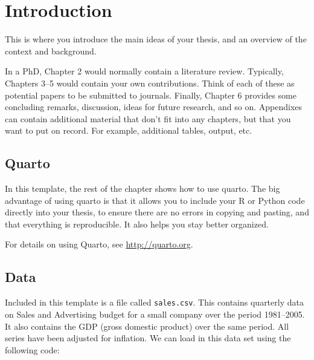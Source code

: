 \documentclass[letterpaper,             %
               oneside,                 %
               \pointsize]              %
               {memoir}
\begin{document}
\mainmatter


\hypertarget{sec-intro}{%
\chapter{Introduction}\label{sec-intro}}

This is where you introduce the main ideas of your thesis, and an
overview of the context and background.

In a PhD, Chapter 2 would normally contain a literature review.
Typically, Chapters 3--5 would contain your own contributions. Think of
each of these as potential papers to be submitted to journals. Finally,
Chapter 6 provides some concluding remarks, discussion, ideas for future
research, and so on. Appendixes can contain additional material that
don't fit into any chapters, but that you want to put on record. For
example, additional tables, output, etc.

\hypertarget{quarto}{%
\section{Quarto}\label{quarto}}

In this template, the rest of the chapter shows how to use quarto. The
big advantage of using quarto is that it allows you to include your R or
Python code directly into your thesis, to ensure there are no errors in
copying and pasting, and that everything is reproducible. It also helps
you stay better organized.

For details on using Quarto, see \url{http://quarto.org}.

\hypertarget{data}{%
\section{Data}\label{data}}

Included in this template is a file called \texttt{sales.csv}. This
contains quarterly data on Sales and Advertising budget for a small
company over the period 1981--2005. It also contains the GDP (gross
domestic product) over the same period. All series have been adjusted
for inflation. We can load in this data set using the following code:
\end{document}
